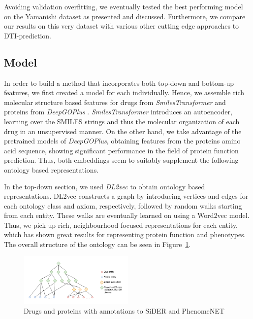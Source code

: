 \documentclass{bioinfo}
\begin{document}
Avoiding validation overfitting, we eventually tested the best
performing model on the Yamanishi dataset as presented and
discussed. Furthermore, we compare our results on this very dataset
with various other cutting edge approaches to DTI-prediction.


\subsection{Model}

In order to build a method that incorporates both top-down and
bottom-up features, we first created a model for each
individually. Hence, we assemble rich molecular structure based
features for drugs from
\textit{SmilesTransformer} \citep{SmilesTransformer} and proteins from
\textit{DeepGOPlus} \citep{DeepGoPlus}. \textit{SmilesTransformer}
introduces an autoencoder, learning over the SMILES strings and thus
the molecular organization of each drug in an unsupervised manner. On
the other hand, we take advantage of the pretrained models of
\textit{DeepGOPlus}, obtaining features from the proteins amino acid
sequence, showing significant performance in the field of protein
function prediction. Thus, both embeddings seem to suitably supplement
the following ontology based representations.


In the top-down section, we used \textit{DL2vec} \citep{DL2vec2020} to
obtain ontology based representations. DL2vec constructs a graph by
introducing vertices and edges for each ontology class and axiom,
respectively, followed by random walks starting from each
entity. These walks are eventually learned on using a Word2vec
\citep{Word2vec2013} model. Thus, we pick up rich, neighbourhood
focused representations for each entity, which has shown great results
for representing protein function and phenotypes. The overall
structure of the ontology can be seen in Figure~\ref{fig:Onto}.

\begin{figure}[!tpb]%
	\centerline{\includegraphics[width=0.5\textwidth]{figures/drug_protein_ontology_network.png}}
	\caption{Drugs and proteins with annotations to SiDER and PhenomeNET}
	\label{fig:Onto}
\end{figure}
\end{document}
